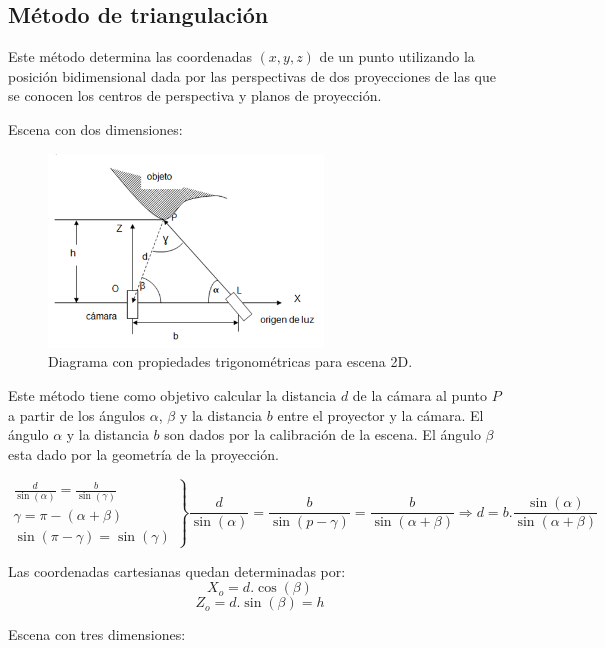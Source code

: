 \subsection{Método de triangulación}
Este método determina las coordenadas $(x,y,z)$ de un punto utilizando la posición bidimensional dada por las perspectivas de dos proyecciones de las que se conocen los centros de perspectiva y planos de proyección\cite{PresUnivYonsei}.

Escena con dos dimensiones:

\begin{figure}[H]
  \centering
    \includegraphics[width=0.65\textwidth]{./Cap6_reconstruccion/triangulacion.PNG}
  \caption{Diagrama con propiedades trigonométricas para escena 2D.}
  \label{fig:Triangulacion}
\end{figure}

Este método tiene como objetivo calcular la distancia $d$ de la cámara al punto $P$ a partir de los ángulos $\alpha$, $\beta$ y la distancia $b$ entre el proyector y la cámara.
El ángulo $\alpha$ y la distancia $b$ son dados por la calibración de la escena.
El ángulo $\beta$ esta dado por la geometría de la proyección.

\[
\left.
\begin{array}{l}
\frac{d}{\sin (\alpha)} = \frac{b}{\sin (\gamma)} 	\\
\gamma = \pi - (\alpha + \beta)						\\
\sin (\pi - \gamma) = \sin (\gamma)
\end{array}
\right \rbrace
\frac{d}{\sin(\alpha)} = \frac{b}{\sin(p - \gamma)} = \frac{b}{\sin(\alpha + \beta)} \Rightarrow d = b . \frac{\sin(\alpha)}{\sin(\alpha + \beta)}
\]

Las coordenadas cartesianas quedan determinadas por:
\[
X_o = d. \cos (\beta)
\]
\[
Z_o = d. \sin (\beta) = h
\]

Escena con tres dimensiones:

